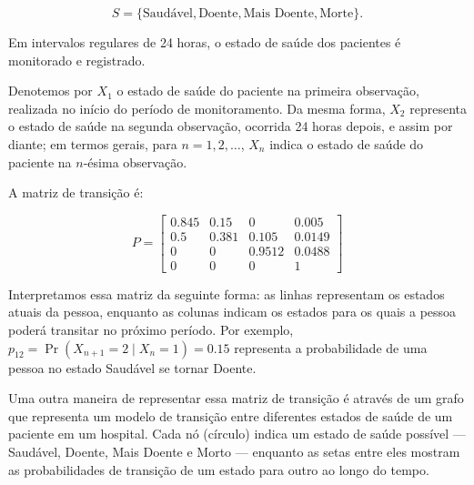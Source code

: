 \documentclass[12pt]{article}
\theoremstyle{break}
\begin{document}
\[
S = \{ \text{Saudável}, \text{Doente}, \text{Mais Doente}, \text{Morte} \}.
\]

Em intervalos regulares de 24 horas, o estado de saúde dos pacientes é monitorado e registrado.

Denotemos por \( X_1 \) o estado de saúde do paciente na primeira observação, realizada no início do período de monitoramento. Da mesma forma, \( X_2 \) representa o estado de saúde na segunda observação, ocorrida 24 horas depois, e assim por diante; em termos gerais, para \( n = 1, 2, \dots \), \( X_n \) indica o estado de saúde do paciente na \( n \)-ésima observação.


A matriz de transição é:

\[
P = 
\begin{bmatrix}
0.845 & 0.15  & 0     & 0.005 \\ 
0.5   & 0.381 & 0.105 & 0.0149 \\
0     & 0     & 0.9512 & 0.0488 \\
0     & 0     & 0     & 1
\end{bmatrix}
\]


Interpretamos essa matriz da seguinte forma: as linhas representam os estados atuais da pessoa, enquanto as colunas indicam os estados para os quais a pessoa poderá transitar no próximo período. Por exemplo, \( p_{12} = \Pr(X_{n+1} = 2 \mid X_n = 1) =  0.15 \) representa a probabilidade de uma pessoa no estado Saudável se tornar Doente.




Uma outra maneira de representar essa matriz de transição é através de um  grafo que representa um modelo de transição entre diferentes estados de saúde de um paciente em um hospital. Cada nó (círculo) indica um estado de saúde possível — Saudável, Doente, Mais Doente e Morto — enquanto as setas entre eles mostram as probabilidades de transição de um estado para outro ao longo do tempo. 
\end{document}
